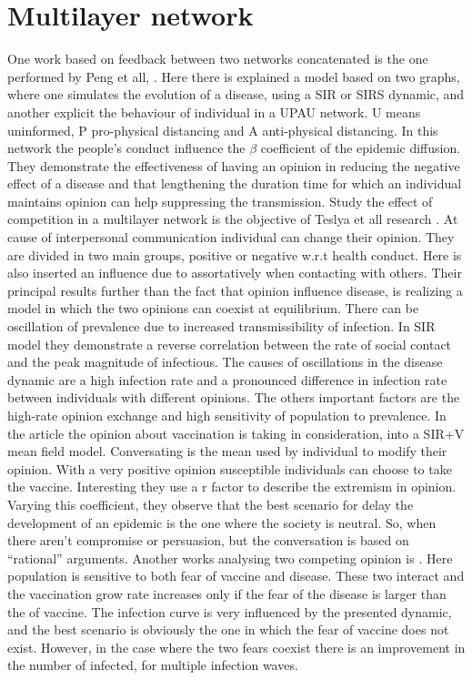 \section{Multilayer network}
One work based on feedback between two networks concatenated is the one performed by Peng et all, \cite{Peng2021}. Here there is explained a model based on two graphs, where one simulates the evolution of a disease, using a SIR or SIRS dynamic, and another explicit the behaviour of individual in a UPAU network. U means uninformed, P pro-physical distancing and A anti-physical distancing.  In this network the people’s conduct influence the $\beta$ coefficient of the epidemic diffusion. They demonstrate the effectiveness of having an opinion in reducing the negative effect of a disease and that lengthening the duration time for which an individual maintains opinion can help suppressing the transmission.
Study the effect of competition in a multilayer network is the objective of Teslya et all research \cite{teslya2022}. At cause of interpersonal communication individual can change their opinion. They are divided in two main groups, positive or negative w.r.t health conduct. Here is also inserted an influence due to assortatively when contacting with others. Their principal results further than the fact that opinion influence disease, is realizing a model in which the two opinions can coexist at equilibrium. There can be oscillation of prevalence due to increased transmissibility of infection. In SIR model they demonstrate a reverse correlation between the rate of social contact and the peak magnitude of infectious. The causes of oscillations in the disease dynamic are a high infection rate and a pronounced difference in infection rate between individuals with different opinions. The others important factors are the high-rate opinion exchange and high sensitivity of population to prevalence. 
In the article \cite{ Alvarez_Zuzek_2017} the opinion about vaccination is taking in consideration, into a SIR+V mean field model. Conversating is the mean used by individual to modify their opinion. With a very positive opinion susceptible individuals can choose to take the vaccine. Interesting they use a r factor to describe the extremism in opinion. Varying this coefficient, they observe that the best scenario for delay the development of an epidemic is the one where the society is neutral. So, when there aren’t compromise or persuasion, but the conversation is based on “rational” arguments.  Another works analysing two competing opinion is \cite{Epstein_2021}. Here population is sensitive to both fear of vaccine and disease. These two interact and the vaccination grow rate increases only if the fear of the disease is larger than the of vaccine.  The infection curve is very influenced by the presented dynamic, and the best scenario is obviously the one in which the fear of vaccine does not exist. However, in the case where the two fears coexist there is an improvement in the number of infected, for multiple infection waves.
